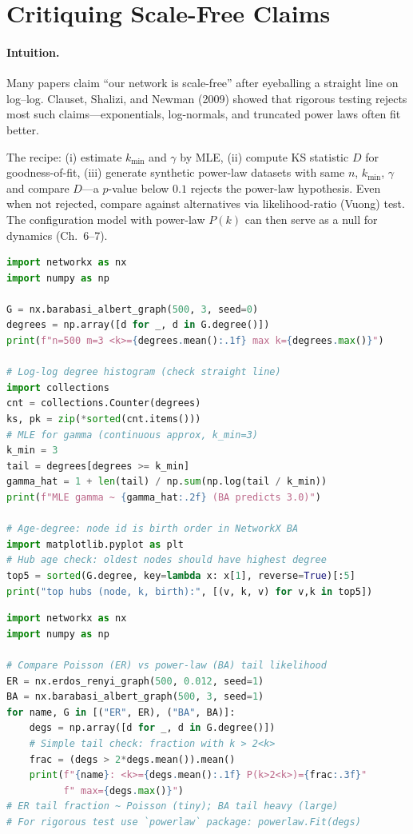 \section{Critiquing Scale-Free Claims}
\label{sec:clauset}
\paragraph{Intuition.} Many papers claim ``our network is scale-free'' after eyeballing a straight line on log--log. Clauset, Shalizi, and Newman (2009) showed that rigorous testing rejects most such claims---exponentials, log-normals, and truncated power laws often fit better.

The recipe: (i) estimate $k_{\min}$ and $\gamma$ by MLE, (ii) compute KS statistic $D$ for goodness-of-fit, (iii) generate synthetic power-law datasets with same $n$, $k_{\min}$, $\gamma$ and compare $D$---a $p$-value below $0.1$ rejects the power-law hypothesis. Even when not rejected, compare against alternatives via likelihood-ratio (Vuong) test. The configuration model with power-law $P(k)$ can then serve as a null for dynamics (Ch.~6--7).

\begin{lstlisting}[language=Python, caption={BA simulation: growth, exponent, and age--degree correlation.}, label={lst:ba-sim}]
import networkx as nx
import numpy as np

G = nx.barabasi_albert_graph(500, 3, seed=0)
degrees = np.array([d for _, d in G.degree()])
print(f"n=500 m=3 <k>={degrees.mean():.1f} max k={degrees.max()}")

# Log-log degree histogram (check straight line)
import collections
cnt = collections.Counter(degrees)
ks, pk = zip(*sorted(cnt.items()))
# MLE for gamma (continuous approx, k_min=3)
k_min = 3
tail = degrees[degrees >= k_min]
gamma_hat = 1 + len(tail) / np.sum(np.log(tail / k_min))
print(f"MLE gamma ~ {gamma_hat:.2f} (BA predicts 3.0)")

# Age-degree: node id is birth order in NetworkX BA
import matplotlib.pyplot as plt
# Hub age check: oldest nodes should have highest degree
top5 = sorted(G.degree, key=lambda x: x[1], reverse=True)[:5]
print("top hubs (node, k, birth):", [(v, k, v) for v,k in top5])
\end{lstlisting}

\begin{lstlisting}[language=Python, caption={PLFit and Clauset test sketch: is this really a power law?}, label={lst:plfit}]
import networkx as nx
import numpy as np

# Compare Poisson (ER) vs power-law (BA) tail likelihood
ER = nx.erdos_renyi_graph(500, 0.012, seed=1)
BA = nx.barabasi_albert_graph(500, 3, seed=1)
for name, G in [("ER", ER), ("BA", BA)]:
    degs = np.array([d for _, d in G.degree()])
    # Simple tail check: fraction with k > 2<k>
    frac = (degs > 2*degs.mean()).mean()
    print(f"{name}: <k>={degs.mean():.1f} P(k>2<k>)={frac:.3f}"
          f" max={degs.max()}")
# ER tail fraction ~ Poisson (tiny); BA tail heavy (large)
# For rigorous test use `powerlaw` package: powerlaw.Fit(degs)
\end{lstlisting}

